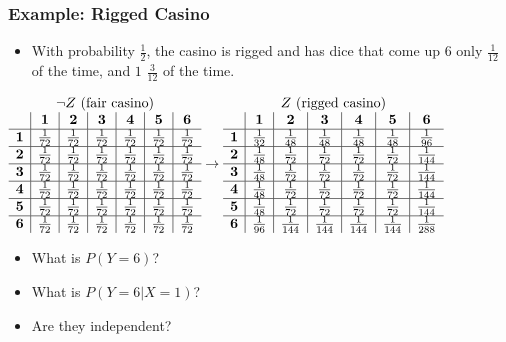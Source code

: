 \documentclass[xcolor=dvipsnames,ignorenonframetext]{beamer}
\begin{document}
\begin{frame}
  \frametitle{Example: Rigged Casino}
    \begin{itemize}
    \item With probability $\frac{1}{2}$, the casino is rigged and has dice that
      come up $6$ only $\frac{1}{12}$ of the time, and $1$ $\frac{3}{12}$ of the
      time.
  \end{itemize}
  {\small{}
    $\begin{array}{r|c|c|c|c|c|c}
      \multicolumn{7}{c}{\neg Z \text{ (fair casino)}}\\
    & \textbf{1} & \textbf{2} & \textbf{3} & \textbf{4} & \textbf{5} & \textbf{6}\\\hline
    \textbf{1} & \frac{1}{72} & \frac{1}{72} & \frac{1}{72} & \frac{1}{72} & \frac{1}{72}& \frac{1}{72}\\\hline
    \textbf{2} & \frac{1}{72} & \frac{1}{72} & \frac{1}{72} & \frac{1}{72} & \frac{1}{72}& \frac{1}{72}\\\hline
    \textbf{3} & \frac{1}{72} & \frac{1}{72} & \frac{1}{72} & \frac{1}{72} & \frac{1}{72}& \frac{1}{72}\\\hline
    \textbf{4} & \frac{1}{72} & \frac{1}{72} & \frac{1}{72} & \frac{1}{72} & \frac{1}{72}& \frac{1}{72}\\\hline
    \textbf{5} & \frac{1}{72} & \frac{1}{72} & \frac{1}{72} & \frac{1}{72} & \frac{1}{72}& \frac{1}{72}\\\hline
    \textbf{6} & \frac{1}{72} & \frac{1}{72} & \frac{1}{72} & \frac{1}{72} & \frac{1}{72}& \frac{1}{72}\\
  \end{array}\rightarrow
  \begin{array}{r|c|c|c|c|c|c}
    \multicolumn{7}{c}{Z \text{ (rigged casino)}}\\
    & \textbf{1} & \textbf{2} & \textbf{3} & \textbf{4} & \textbf{5} & \textbf{6}\\\hline
    \textbf{1} & \frac{1}{32} & \frac{1}{48} & \frac{1}{48} & \frac{1}{48} & \frac{1}{48}& \frac{1}{96}\\\hline
    \textbf{2} & \frac{1}{48} & \frac{1}{72} & \frac{1}{72} & \frac{1}{72} & \frac{1}{72}& \frac{1}{144}\\\hline
    \textbf{3} & \frac{1}{48} & \frac{1}{72} & \frac{1}{72} & \frac{1}{72} & \frac{1}{72}& \frac{1}{144}\\\hline
    \textbf{4} & \frac{1}{48} & \frac{1}{72} & \frac{1}{72} & \frac{1}{72} & \frac{1}{72}& \frac{1}{144}\\\hline
    \textbf{5} & \frac{1}{48} & \frac{1}{72} & \frac{1}{72} & \frac{1}{72} & \frac{1}{72}& \frac{1}{144}\\\hline
    \textbf{6} & \frac{1}{96} & \frac{1}{144} & \frac{1}{144} & \frac{1}{144} & \frac{1}{144}& \frac{1}{288}\\
  \end{array}$}
  \begin{itemize}
  \item What is $P(Y=6)$?
  \item What is $P(Y=6|X=1)$?
  \item Are they independent?
  \end{itemize}
\end{frame}
\end{document}
